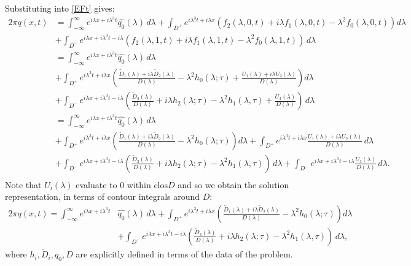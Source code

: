 Substituting into \eqref{EFt} gives: 
\begin{equation*}
\begin{aligned}
2\pi q(x, t) &= \int_{-\infty}^\infty e^{i\lambda x + i \lambda^3 t}\hat{q_0}(\lambda)\,d\lambda + \int_{D^+} e^{i \lambda^3 t+i\lambda x}\left(f_2(\lambda, 0, t) + i \lambda f_1(\lambda, 0, t) - \lambda^2 f_0(\lambda, 0, t)\right)d\lambda \\
&+\int_{D^-} e^{i\lambda x+i \lambda^3 t-i\lambda} \left(f_2(\lambda, 1, t) + i \lambda f_1(\lambda, 1, t) - \lambda^2 f_0(\lambda, 1, t)\right)\,d\lambda\\
&= \int_{-\infty}^\infty e^{i\lambda x + i \lambda^3 t}\hat{q_0}(\lambda)\,d\lambda \\
&+ \int_{D^+} e^{i \lambda^3 t+i\lambda x}\left( \frac{\widetilde{D}_1(\lambda)+i \lambda\widetilde{D}_2(\lambda)}{D(\lambda)} - \lambda^2 h_0(\lambda; \tau) + \frac{U_1(\lambda) + i \lambda  U_2(\lambda)}{D(\lambda)} \right)d\lambda \\
&+ \int_{D^-} e^{i\lambda x+i \lambda^3 t-i\lambda} \left(\frac{\widetilde{D}_3(\lambda)}{D(\lambda)} + i \lambda h_2(\lambda; \tau) - \lambda^2 h_1(\lambda, \tau) + \frac{U_3(\lambda)}{D(\lambda)} \right)\,d\lambda\\
&= \int_{-\infty}^\infty e^{i\lambda x + i \lambda^3 t}\hat{q_0}(\lambda)\,d\lambda \\
&+ \int_{D^+} e^{i \lambda^3 t+i\lambda x}\left( \frac{\widetilde{D}_1(\lambda)+i \lambda\widetilde{D}_2(\lambda)}{D(\lambda)} - \lambda^2 h_0(\lambda; \tau) \right)d\lambda + \int_{D^+} e^{i \lambda^3 t+i\lambda x}\frac{U_1(\lambda) + i \lambda  U_2(\lambda)}{D(\lambda)}\, d\lambda  \\
&+ \int_{D^-} e^{i\lambda x+i \lambda^3 t-i\lambda} \left(\frac{\widetilde{D}_3(\lambda)}{D(\lambda)} + i \lambda h_2(\lambda; \tau) - \lambda^2 h_1(\lambda, \tau)\right)\,d\lambda + \int_{D^-} e^{i\lambda x+i \lambda^3 t-i\lambda} \frac{U_3(\lambda)}{D(\lambda)} \,d\lambda. \\
\end{aligned}
\end{equation*}
Note that $U_i(\lambda)$ evaluate to $0$ within $\mathrm{clos}{D}$ and so we obtain the solution representation, in terms of contour integrals around $D:$
\begin{equation*}\label{SRtau}
\begin{aligned}
2\pi q(x, t) = \int_{-\infty}^\infty e^{i\lambda x + i \lambda^3 t}&\hat{q_0}(\lambda)\,d\lambda + \int_{D^+} e^{i \lambda^3 t+i\lambda x}\left( \frac{\widetilde{D}_1(\lambda)+i \lambda\widetilde{D}_2(\lambda)}{D(\lambda)} - \lambda^2 h_0(\lambda; \tau) \right)d\lambda \\
&+\int_{D^-} e^{i\lambda x+i \lambda^3 t-i\lambda} \left(\frac{\widetilde{D}_3(\lambda)}{D(\lambda)} + i \lambda h_2(\lambda; \tau) - \lambda^2 h_1(\lambda, \tau)\right)\,d\lambda,
\end{aligned}\tag{SR$\tau$}
\end{equation*} 
where $h_i, \widetilde{D}_i, q_0, D$ are explicitly defined in terms of the data of the problem.